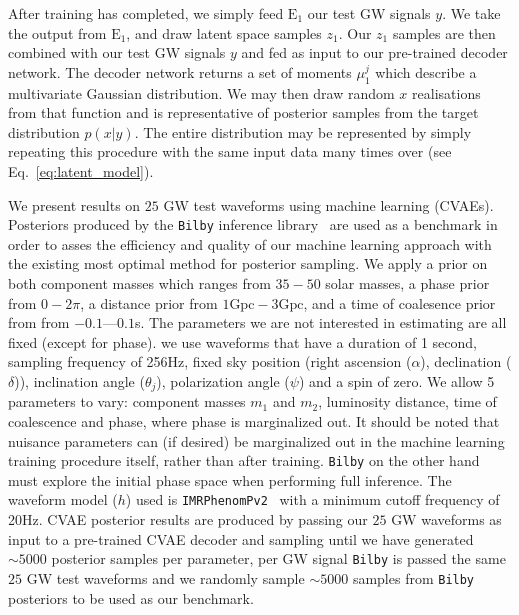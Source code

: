 \documentclass[%
showpacs,
 amsmath,amssymb,
 aps,
 twocolumn,
 prl,
 reprint,
floatfix,
]{revtex4-1}
\begin{document}
%
%
After training has completed, we simply feed $\textrm{E}_1$ our test GW signals
$y$. We take the output from $\textrm{E}_1$, and draw latent space samples 
$z_1$. Our
$z_1$ samples are then combined with our test GW signals $y$ and fed
as input to our pre-trained decoder network. The decoder network returns a set
of moments $\mu^{j}_1$ which describe a multivariate Gaussian distribution.
We may then draw random $x$ realisations from that function and is representative of posterior samples from the target
distribution $p(x|y)$. The entire distribution may be represented by 
simply repeating this procedure with the same input data many times over  
(see Eq.~\ref{eq:latent_model}).

%
%
%
%
We present results on $25$ \ac{GW} test waveforms using machine learning 
(\ac{CVAE}s). Posteriors produced by the \texttt{Bilby} inference library~\cite{1811.02042} are used as a benchmark 
in order to asses the efficiency and quality of our machine learning approach 
with the existing most optimal method for posterior sampling. We apply a prior on both component masses which ranges from $35 - 50$
solar masses, a phase prior from $0 - 2\pi$, a distance prior from  $1\textrm{Gpc} - 3\textrm{Gpc}$, and a time of coalesence prior from
from $-0.1$---$0.1$s. The parameters we are not interested in estimating are all fixed (except for phase). we use waveforms that have a duration of 1 second, sampling frequency
of 256Hz, fixed sky position (right ascension ($\alpha$), declination ($\delta$)), inclination angle ($\theta_j$), polarization angle ($\psi$) and a spin of zero. We allow 5 parameters to vary: component masses $m_1$ and $m_2$, luminosity
distance, time of coalescence and phase, where phase is marginalized
out. It should be noted that nuisance parameters can (if desired) be 
marginalized out in the machine learning training procedure itself, rather 
than after training. \texttt{Bilby} on the other hand must explore the initial 
phase space when performing full inference. The waveform
model ($h$) used is
\texttt{IMRPhenomPv2}~\cite{1809.10113} with a minimum cutoff frequency of
20Hz. \ac{CVAE} posterior results are produced by passing our $25$ \ac{GW} 
waveforms as input to a pre-trained \ac{CVAE} decoder and sampling until we have 
generated $\sim5000$ posterior samples per parameter, per \ac{GW} signal 
\texttt{Bilby} is passed the same $25$ \ac{GW} test waveforms and we randomly sample $\sim5000$ samples from \texttt{Bilby} posteriors to be used as our benchmark.
\end{document}
